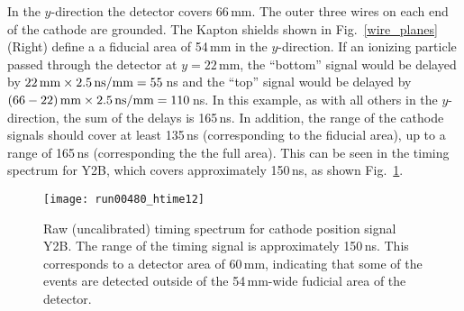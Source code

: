 \begin{sloppypar}
In the $y$-direction the detector covers 66\,mm.  The outer three wires on each end of the cathode are grounded. The Kapton shields shown in Fig.~\ref{wire_planes}\,(Right) define a a fiducial area of 54\,mm in the $y$-direction.  If an ionizing  particle passed through the detector at $y=22$\,mm, the ``bottom'' signal would be delayed by $22\textrm{\,mm} \times 2.5\textrm{\,ns/mm}=55$\,ns and the ``top'' signal would be delayed by $(66-22)\textrm{\,mm} \times 2.5\textrm{\,ns/mm}=110$\,ns.  In this example, as with all others in the $y$-direction, the sum of the delays is 165\,ns. In addition, the range of the cathode signals should cover at least 135\,ns (corresponding to the fiducial area), up to a range of 165\,ns (corresponding the the full area).  This can be seen in the timing spectrum for Y2B, which covers approximately 150\,ns, as shown Fig.~\ref{htime}.
\end{sloppypar}

\begin{figure}%
\texttt{[image: run00480\_htime12]}%
\caption{Raw (uncalibrated) timing spectrum for cathode position signal Y2B.  The range of the timing signal is approximately 150\,ns.  This corresponds to a detector area of 60\,mm, indicating that some of the events are detected outside of the 54\,mm-wide fudicial area of the detector.}%
\label{htime}%
\end{figure}

